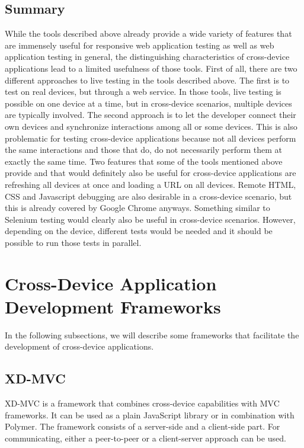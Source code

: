\subsection{Summary}

While the tools described above already provide a wide variety of features that are immensely useful for responsive web application testing as well as web application testing in general, the distinguishing characteristics of cross-device applications lead to a limited usefulness of those tools. First of all, there are two different approaches to live testing in the tools described above. The first is to test on real devices, but through a web service. In those tools, live testing is possible on one device at a time, but in cross-device scenarios, multiple devices are typically involved. The second approach is to let the developer connect their own devices and synchronize interactions among all or some devices. This is also problematic for testing cross-device applications because not all devices perform the same interactions and those that do, do not necessarily perform them at exactly the same time. Two features that some of the tools mentioned above provide and that would definitely also be useful for cross-device applications are refreshing all devices at once and loading a URL on all devices. Remote HTML, CSS and Javascript debugging are also desirable in a cross-device scenario, but this is already covered by Google Chrome anyways. Something similar to Selenium testing would clearly also be useful in cross-device scenarios. However, depending on the device, different tests would be needed and it should be possible to run those tests in parallel.

\section{Cross-Device Application Development Frameworks}

In the following subsections, we will describe some frameworks that facilitate the development of cross-device applications.

\subsection{XD-MVC}

XD-MVC is a framework that combines cross-device capabilities with MVC frameworks. It can be used as a plain JavaScript library or in combination with Polymer. The framework consists of a server-side and a client-side part. For communicating, either a peer-to-peer or a client-server approach can be used.

